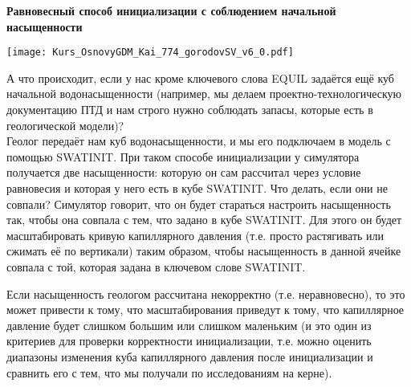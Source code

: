 \textbf{Равновесный способ инициализации с соблюдением начальной насыщенности}

\texttt{[image: Kurs\_OsnovyGDM\_Kai\_774\_gorodovSV\_v6\_0.pdf]}

А что происходит, если у нас кроме ключевого слова EQUIL задаётся ещё куб начальной водонасыщенности (например, мы делаем проектно-технологическую документацию ПТД и нам строго нужно соблюдать запасы, которые есть в геологической модели)?
\\

Геолог передаёт нам куб водонасыщенности, и мы его подключаем в модель с помощью SWATINIT.
При таком способе инициализации у симулятора получается две насыщенности: которую он сам рассчитал через условие равновесия и которая у него есть в кубе SWATINIT.
Что делать, если они не совпали?
Симулятор говорит, что он будет стараться настроить насыщенность так, чтобы она совпала с тем, что задано в кубе SWATINIT.
Для этого он будет масштабировать кривую капиллярного давления (т.е. просто растягивать или сжимать её по вертикали) таким образом, чтобы насыщенность в данной ячейке совпала с той, которая задана в ключевом слове SWATINIT.

Если насыщенность геологом рассчитана некорректно (т.е. неравновесно), то это может привести к тому, что масштабирования приведут к тому, что капиллярное давление будет слишком большим или слишком маленьким (и это один из критериев для проверки корректности инициализации, т.е. можно оценить диапазоны изменения куба капиллярного давления после инициализации и сравнить его с тем, что мы получали по исследованиям на керне).
\\

